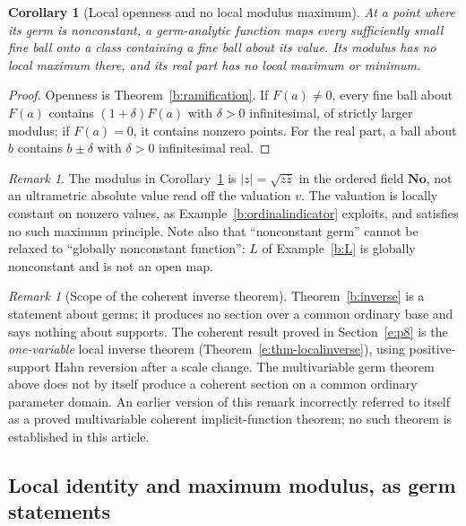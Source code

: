 \documentclass[11pt,a4paper]{article}
\numberwithin{equation}{section}
\newtheorem{corollary}[theorem]{Corollary}
\theoremstyle{definition}
\theoremstyle{remark}
\newtheorem{remark}[theorem]{Remark}
\theoremstyle{plain}
\newcommand{\No}{\mathbf{No}}
\newcommand{\abs}[1]{\lvert #1\rvert}
\begin{document}
\begin{corollary}[Local openness and no local modulus maximum]
\label{b:localopen}
At a point where its germ is nonconstant, a germ-analytic function maps
every sufficiently small fine ball onto a class containing a fine ball
about its value. Its modulus has no local maximum there, and its real part
has no local maximum or minimum.
\end{corollary}

\begin{proof}
Openness is Theorem~\ref{b:ramification}. If $F(a)\ne0$, every fine ball
about $F(a)$ contains $(1+\delta)F(a)$ with $\delta>0$ infinitesimal,
of strictly larger modulus; if $F(a)=0$, it contains nonzero points. For
the real part, a ball about $b$ contains $b\pm\delta$ with $\delta>0$
infinitesimal real.
\end{proof}

\begin{remark}
\label{b:modulus-not-valuation}
The modulus in Corollary~\ref{b:localopen} is $\abs z=\sqrt{z\bar z}$ in
the ordered field $\No$, not an ultrametric absolute value read off the
valuation $v$. The valuation is locally constant on nonzero values, as
Example~\ref{b:ordinalindicator} exploits, and satisfies no such maximum
principle. Note also that ``nonconstant germ'' cannot be relaxed to
``globally nonconstant function'': $L$ of Example~\ref{b:L} is globally
nonconstant and is not an open map.
\end{remark}

\begin{remark}[Scope of the coherent inverse theorem]
\label{b:coherent-implicit-elsewhere}
Theorem~\ref{b:inverse} is a statement about germs; it produces no section
over a common ordinary base and says nothing about supports. The coherent result proved in Section~\ref{e:p8} is the
\emph{one-variable} local inverse theorem
(Theorem~\ref{e:thm-localinverse}), using positive-support Hahn reversion
after a scale change. The multivariable germ theorem above does not by
itself produce a coherent section on a common ordinary parameter domain.
An earlier version of this remark incorrectly referred to itself as a
proved multivariable coherent implicit-function theorem; no such theorem
is established in this article.
\end{remark}

\subsection{Local identity and maximum modulus, as germ statements}
\end{document}
